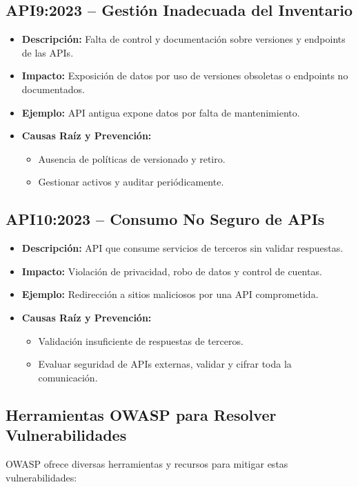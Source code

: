 \documentclass[a4paper,12pt]{article}
\begin{document}
\subsection{API9:2023 – Gestión Inadecuada del Inventario}
\begin{itemize}
    \item \textbf{Descripción:} Falta de control y documentación sobre versiones y endpoints de las APIs.
    \item \textbf{Impacto:} Exposición de datos por uso de versiones obsoletas o endpoints no documentados.
    \item \textbf{Ejemplo:} API antigua expone datos por falta de mantenimiento.
    \item \textbf{Causas Raíz y Prevención:}
    \begin{itemize}
        \item Ausencia de políticas de versionado y retiro.
        \item Gestionar activos y auditar periódicamente.
    \end{itemize}
\end{itemize}

\subsection{API10:2023 – Consumo No Seguro de APIs}
\begin{itemize}
    \item \textbf{Descripción:} API que consume servicios de terceros sin validar respuestas.
    \item \textbf{Impacto:} Violación de privacidad, robo de datos y control de cuentas.
    \item \textbf{Ejemplo:} Redirección a sitios maliciosos por una API comprometida.
    \item \textbf{Causas Raíz y Prevención:}
    \begin{itemize}
        \item Validación insuficiente de respuestas de terceros.
        \item Evaluar seguridad de APIs externas, validar y cifrar toda la comunicación.
    \end{itemize}
\end{itemize}

\subsection{Herramientas OWASP para Resolver Vulnerabilidades}
OWASP ofrece diversas herramientas y recursos para mitigar estas vulnerabilidades:
\end{document}
